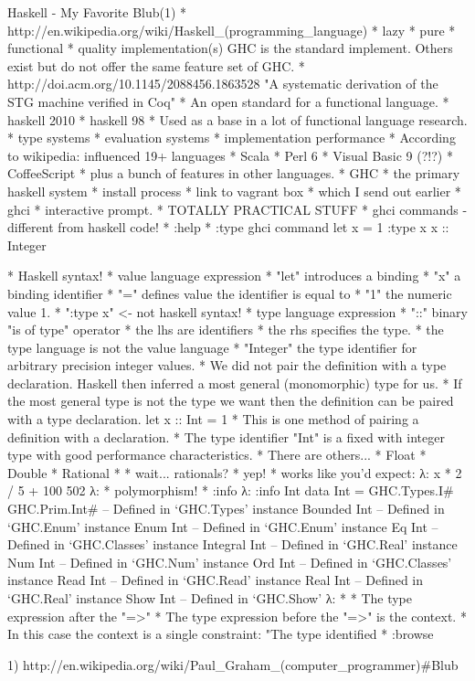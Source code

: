 \usepackage{cite}

Haskell - My Favorite Blub(1)
  * http://en.wikipedia.org/wiki/Haskell_(programming_language)
    * lazy
    * pure
    * functional
    * quality implementation(s)
      GHC is the standard implement. Others exist but do not offer the same feature set of GHC.
      * http://doi.acm.org/10.1145/2088456.1863528 "A systematic derivation of the STG machine
      verified in Coq"
  * An open standard for a functional language.
    * haskell 2010
    * haskell 98
  * Used as a base in a lot of functional language research.
    * type systems
    * evaluation systems
    * implementation performance
  * According to wikipedia: influenced 19+ languages
    * Scala
    * Perl 6
    * Visual Basic 9 (?!?)
    * CoffeeScript
    * plus a bunch of features in other languages.
  * GHC
    * the primary haskell system
  * install process
    * link to vagrant box
    * which I send out earlier
  * ghci
    * interactive prompt.
  * TOTALLY PRACTICAL STUFF
  * ghci commands - different from haskell code!
    * :help
  * :type ghci command
let x = 1
:type x
x :: Integer

  * Haskell syntax!
  * value language expression
    * "let" introduces a binding
    * "x" a binding identifier
    * "=" defines value the identifier is equal to
    * "1" the numeric value 1.
  * ":type x" <- not haskell syntax!
  * type language expression
    * "::" binary "is of type" operator
    * the lhs are identifiers
    * the rhs specifies the type.
      * the type language is not the value language
    * "Integer" the type identifier for arbitrary precision integer values.
  * We did not pair the definition with a type declaration. Haskell then inferred a most general
  (monomorphic) type for us.
  * If the most general type is not the type we want then the definition can be paired with a type declaration.
let x :: Int = 1
  * This is one method of pairing a definition with a declaration.
  * The type identifier "Int" is a fixed with integer type with good performance characteristics.
  * There are others...
    * Float
    * Double
    * Rational
    * 
  * wait... rationals?
    * yep!
    * works like you'd expect:
λ: x * 2 / 5 + 100
502 %
λ:
* polymorphism!
* :info
λ: :info Int
data Int = GHC.Types.I# GHC.Prim.Int#   -- Defined in `GHC.Types'
instance Bounded Int -- Defined in `GHC.Enum'
instance Enum Int -- Defined in `GHC.Enum'
instance Eq Int -- Defined in `GHC.Classes'
instance Integral Int -- Defined in `GHC.Real'
instance Num Int -- Defined in `GHC.Num'
instance Ord Int -- Defined in `GHC.Classes'
instance Read Int -- Defined in `GHC.Read'
instance Real Int -- Defined in `GHC.Real'
instance Show Int -- Defined in `GHC.Show'
λ:
  *
    * The type expression after the "=>" 
    * The type expression before the "=>" is the context.
    * In this case the context is a single constraint:
      "The type identified 
* :browse

1) http://en.wikipedia.org/wiki/Paul_Graham_(computer_programmer)#Blub

